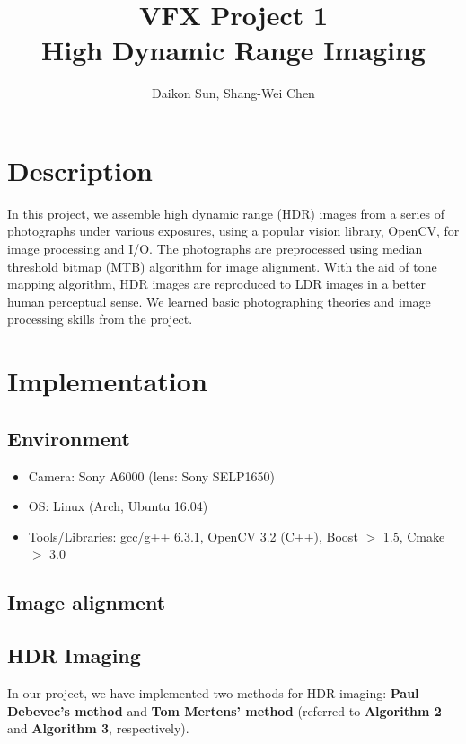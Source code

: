 \documentclass[11pt]{article}
\title{\bf{VFX Project 1\\\large{High Dynamic Range Imaging}}\vspace{-10pt}}
\author{Daikon Sun, Shang-Wei Chen}
\date{}
\begin{document}
\maketitle
\section{Description}
In this project, we assemble high dynamic range (HDR) images from a series of photographs under various exposures, using a popular vision library, OpenCV, for image processing and I/O. The photographs are preprocessed using median threshold bitmap (MTB) algorithm for image alignment. With the aid of tone mapping algorithm, HDR images are reproduced to LDR images in a better human perceptual sense. We learned basic photographing theories and image processing skills from the project. 

\section{Implementation}
\subsection{Environment}
\begin{itemize}
	\itemsep=-2pt
	\item Camera: Sony A6000 (lens: Sony SELP1650)
	\item OS: Linux (Arch, Ubuntu 16.04)
	\item Tools/Libraries: gcc/g++ 6.3.1, OpenCV 3.2 (C++), Boost $>$ 1.5, Cmake $>$ 3.0
\end{itemize}

\subsection{Image alignment}


\subsection{HDR Imaging}
In our project, we have implemented two methods for HDR imaging: \textbf{Paul Debevec's method} \cite{ref:debevec} and \textbf{Tom Mertens' method} \cite{ref:mertens} (referred to \textbf{Algorithm 2} and \textbf{Algorithm 3}, respectively).
\end{document}

